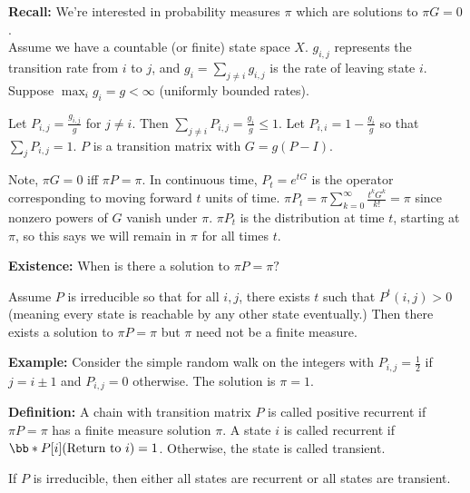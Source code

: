 \documentclass[../../../Master/AppliedStochastics.tex]{subfiles}
\author{Eli}
\date{5 November 2018}
\begin{document}
%


\makelecture


\textbf{Recall:} We're interested in probability measures $\pi$ which are 
solutions to $\pi G=0$. \\


\vspace{5mm}
Assume we have a countable (or finite) state space $X$. $g_{i,j}$ represents 
the transition rate from $i$ to $j$, and $g_i=\sum_{j\neq i}g_{i,j}$ is the 
rate of leaving state $i$. Suppose $\max_ig_i=g<\infty$ (uniformly bounded 
rates).  

\vspace{5mm}
Let $P_{i,j}=\frac{g_{i,j}}{g}$ for $j\neq i$. Then $\sum_{j\neq 
i}P_{i,j}=\frac{g_i}{g}\leq 1$. Let $P_{i,i}=1-\frac{g_i}{g}$ so that $\sum_j 
P_{i,j}=1$. $P$ is a transition matrix with $G=g(P-I)$.

\vspace{5mm}
Note, $\pi G=0$ iff $\pi P=\pi$. In continuous time, $P_t=e^{tG}$ is the 
operator corresponding to moving forward $t$ units of time. $\pi 
P_t=\pi\sum_{k=0}^\infty \frac{t^kG^k}{k!}=\pi$ since nonzero powers of $G$ 
vanish 
under $\pi$. $\pi P_t$ is the distribution at time $t$, starting at $\pi$, so 
this says we will remain in $\pi$ for all times $t$.

\vspace{10mm}
\textbf{Existence:} When is there a solution to $\pi P=\pi?$

\vspace{5mm}
Assume $P$ is irreducible so that for all $i,j$, there exists $t$ such that 
$P^t(i,j)>0$ (meaning every state is reachable by any other state eventually.) 
Then there exists a solution to $\pi P=\pi$ but $\pi$ need not be a finite 
measure.

\vspace{5mm}
\textbf{Example:} Consider the simple random walk on the integers with 
$P_{i,j}=\frac{1}{2}$ if $j=i\pm 1$ and $P_{i,j}=0$ otherwise. The solution is 
$\pi=1$.

\vspace{5mm}
\textbf{Definition:} A chain with transition matrix $P$ is called positive 
recurrent if $\pi P=\pi$ has a finite measure solution $\pi$. A state $i$ is 
called recurrent if $\bb* P[i](\text{Return to }i)=1$. Otherwise, the state is 
called transient. 

\vspace{5mm}
If $P$ is irreducible, then either all states are recurrent or all states are 
transient.
\end{document}
